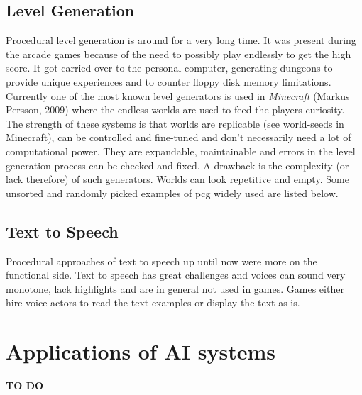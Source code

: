 \documentclass[10pt,a4paper]{article}
\begin{document}
\subsection{Level Generation}
Procedural level generation is around for a very long time. It was present during the arcade games because of the need to possibly play endlessly to get the high score. It got carried over to the personal computer, generating dungeons to provide unique experiences\cite{VanderLinden2014} and to counter floppy disk memory limitations. Currently one of the most known level generators is used in \textit{Minecraft} (Markus Persson, 2009) where the endless worlds are used to feed the players curiosity. The strength of these systems is that worlds are replicable (see world-seeds in Minecraft), can be controlled and fine-tuned and don't necessarily need a lot of computational power. They are expandable, maintainable and errors in the level generation process can be checked and fixed. A drawback is the complexity (or lack therefore) of such generators. Worlds can look repetitive and empty. Some unsorted and randomly picked examples of \gls{pcg} widely used are listed below.

\subsection{Text to Speech}
Procedural approaches of text to speech up until now were more on the functional side. Text to speech has great challenges and voices can sound very monotone, lack highlights and are in general not used in games. Games either hire voice actors to read the text examples or display the text as is.

\section{Applications of AI systems}
\textbf{TO DO}
\end{document}
